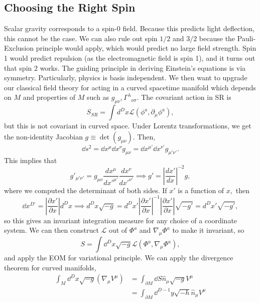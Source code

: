 \documentclass{article}
\numberwithin{equation}{section}
\begin{document}
\subsection{Choosing the Right Spin}
Scalar gravity corresponds to a spin-0 field. Because this predicts light deflection, this cannot be the case. We can also rule out spin $1/2$ and $3/2$ because the Pauli-Exclusion principle would apply, which would predict no large field strength. Spin 1 would predict repulsion (as the electromagnetic field is spin 1), and it turns out that spin 2 works. The guiding principle in deriving Einstein's equations is via symmetry. Particularly, physics is basis independent. We then want to upgrade our classical field theory for acting in a curved spacetime manifold which depends on $M$ and properties of $M$ such as $g_{\mu\nu},\Gamma^{\lambda}{}_{\nu\sigma}.$ The covariant action in SR is 
\begin{equation}
    S_{SR} = \int d^{D}x \mathcal{L}(\phi^a,\partial_\mu \phi^a),
\end{equation}
but this is not covariant in curved space. Under Lorentz transformations, we get the non-identity Jacobian $g\equiv \det(g_{\mu\nu}).$ Then,
\begin{equation}
    \dd{s}^2= \dd{x}^\mu\dd{x}^\nu g_{\mu\nu} = \dd{x}^{\mu'}\dd{x}^{\nu'}g_{\mu'\nu'}. 
\end{equation}
This implies that 
\begin{equation}
    g'_{\mu'\nu'} = g_{\mu\nu}\frac{dx^{\mu}}{dx'^{\mu'}}\frac{dx^{\nu}}{dx'^{\nu'}} \implies g' = \left|\frac{dx'}{dx}\right|^{-2}g,
 \end{equation}
 where we computed the determinant of both sides. If $x'$ is a function of $x,$ then 
 \begin{equation}
    \dd{x}^{D'} = \left|\frac{\partial x'}{\partial x}\right| d^{D}x \implies d^{D}x\sqrt{-g} = d^{D}x'\left|\frac{\partial x'}{\partial x}\right|^{-1}\left|\frac{\partial x'}{\partial x}\right|\sqrt{-g'} = d^{D}x'\sqrt{-g'},
 \end{equation}
 so this gives an invariant integration measure for any choice of a coordinate system. We can then construct $\mathcal{L}$ out of $\Phi^a$ and $\nabla_\mu\Phi^a$ to make it invariant, so 
 \begin{equation}
    S = \int \dd^D{x}\sqrt{-g}\mathcal{L}(\Phi^a,\nabla_\mu\Phi^a),
 \end{equation}
 and apply the EOM for variational principle. We can apply the divergence theorem for curved manifolds,
 \begin{align}
    \int_M \dd^{D}{x}\sqrt{-g}(\nabla_\mu V^{\mu}) &=\int_{\partial M} \dd{S} \hat{n}_{\mu}\sqrt{-g}V^{\mu} \\ 
    &= \int_{\partial M}\dd^{D-1}y\sqrt{-h}\hat{n}_\mu V^{\mu}
 \end{align}
\end{document}
